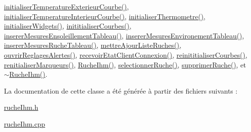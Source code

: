 \hyperlink{class_ruche_ihm_adb1039cc926ceb318c5d851f09d896c1}{initialiser\+Temperature\+Exterieur\+Courbe()}, \hyperlink{class_ruche_ihm_ad7297b44f6431c0b0c42f1b11d78ace1}{initialiser\+Temperature\+Interieur\+Courbe()}, \hyperlink{class_ruche_ihm_afb64cca9f0e46c25487ef059a4826d49}{initialiser\+Thermometre()}, \hyperlink{class_ruche_ihm_a98c493fcd2ef145a3d51ff84bbf8748e}{initialiser\+Widgets()}, \hyperlink{class_ruche_ihm_a4fe15b22538611ad9ffc4d807f8b78fd}{inititialiser\+Courbes()}, \hyperlink{class_ruche_ihm_a6830ca55859cc2899ae8eb51b112557b}{inserer\+Mesures\+Ensoleillement\+Tableau()}, \hyperlink{class_ruche_ihm_a7c292baed04f6240697afb6c6f894358}{inserer\+Mesures\+Environement\+Tableau()}, \hyperlink{class_ruche_ihm_afada4cd970c0e34c3fd62d63e5af7a88}{inserer\+Mesures\+Ruche\+Tableau()}, \hyperlink{class_ruche_ihm_a77cb005fde7e2271e8721c23cef13b3e}{mettre\+Ajour\+Liste\+Ruches()}, \hyperlink{class_ruche_ihm_ab8db02641e73f348fd6162321a3765da}{ouvrir\+Reglages\+Alertes()}, \hyperlink{class_ruche_ihm_a3a3dae9de8c51344aa6e3463db9e6ad9}{recevoir\+Etat\+Client\+Connexion()}, \hyperlink{class_ruche_ihm_a098911c0edd701f7892e3d140ebffbd9}{reinititialiser\+Courbes()}, \hyperlink{class_ruche_ihm_aa136c7922dc441aa86c00ec2d9c8b71c}{renitialiser\+Marqueurs()}, \hyperlink{class_ruche_ihm_a04c2544ba4e9cca6c38f553c32d63dee}{Ruche\+Ihm()}, \hyperlink{class_ruche_ihm_a7324ae6ea574ccdad47783f466933157}{selectionner\+Ruche()}, \hyperlink{class_ruche_ihm_a85729b1ae4f3dfb5130eb45f5a426e3c}{supprimer\+Ruche()}, et \hyperlink{class_ruche_ihm_a4c489bf18e8c9947a375322d03504419}{$\sim$\+Ruche\+Ihm()}.



La documentation de cette classe a été générée à partir des fichiers suivants \+:\begin{DoxyCompactItemize}
\item 
\hyperlink{ruche_ihm_8h}{ruche\+Ihm.\+h}\item 
\hyperlink{ruche_ihm_8cpp}{ruche\+Ihm.\+cpp}\end{DoxyCompactItemize}
